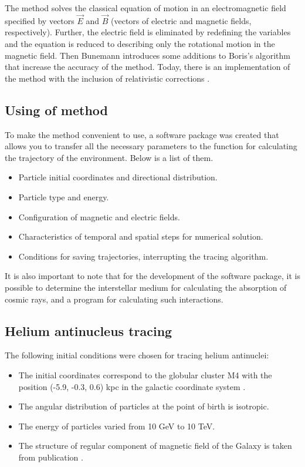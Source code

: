 \documentclass{article}
\begin{document}
The method solves the classical equation of motion in an electromagnetic field specified by vectors ${\vec{E}}$ and  ${\vec{B}}$ (vectors of electric and magnetic fields, respectively). Further, the electric field is eliminated by redefining the variables and the equation is reduced to describing only the rotational motion in the magnetic field. Then Bunemann introduces some additions to Boris's algorithm that increase the accuracy of the method. Today, there is an implementation of the method with the inclusion of relativistic corrections \cite{3}.
\subsection{Using of method }
To make the method convenient to use, a software package was created that allows you to transfer all the necessary parameters to the function for calculating the trajectory of the environment. Below is a list of them.

\begin{itemize}
\item Particle initial coordinates and directional distribution.
\item  Particle type and energy.
\item Configuration of magnetic and electric fields.
\item Characteristics of temporal and spatial steps for numerical solution.
\item  Conditions for saving trajectories, interrupting the tracing algorithm.
\end{itemize}
It is also important to note that for the development of the software package, it is possible to determine the interstellar medium for calculating the absorption of cosmic rays, and a program for calculating such interactions.
\subsection{Helium antinucleus tracing}
The following initial conditions were chosen for tracing helium antinuclei:
\begin{itemize}
\item The initial coordinates correspond to the globular cluster M4 with the position (-5.9, -0.3, 0.6) kpc in the galactic coordinate system \cite{1}.
\item The angular distribution of particles at the point of birth is isotropic.
\item The energy of particles varied from 10 GeV to 10 TeV.
\item The structure of regular component of magnetic field of the Galaxy is taken from publication \cite{2}.
\end{itemize}
\end{document}
